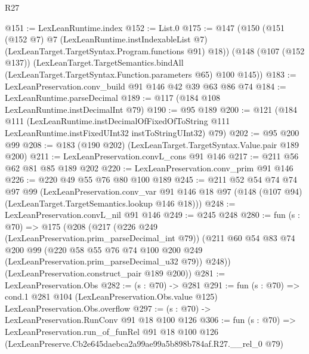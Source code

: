 \begin{lexlean}{R27}
\begin{coremodule}
@151 := LexLeanRuntime.index
@152 := List.{0}
@175 := @147
    (@150
      (@151
        (@152 @7)
        @7
        (LexLeanRuntime.instIndexableList @7)
        (LexLeanTarget.TargetSyntax.Program.functions @91)
        @18))
    (@148
      (@107 (@152 @137))
      (LexLeanTarget.TargetSemantics.bindAll
        (LexLeanTarget.TargetSyntax.Function.parameters @65)
        @100
        @145))
@183 := LexLeanPreservation.conv_build @91 @146 @42 @39 @63 @86 @74
@184 := LexLeanRuntime.parseDecimal
@189 := @117 (@184 @108 LexLeanRuntime.instDecimalInt @79)
@190 := @95 @189
@200 := @121
    (@184
      @111
      (LexLeanRuntime.instDecimalOfFixedOfToString
        @111
        LexLeanRuntime.instFixedUInt32
        instToStringUInt32)
      @79)
@202 := @95 @200 @99
@208 := @183 (@190 @202) (LexLeanTarget.TargetSyntax.Value.pair @189 @200)
@211 := LexLeanPreservation.convL_cons @91 @146
@217 := @211 @56 @62 @81 @85 @189 @202
@220 := LexLeanPreservation.conv_prim @91 @146
@226 := @220 @49 @55 @76 @80 @100 @189
@245 := @211
    @52
    @54
    @74
    @74
    @97
    @99
    (LexLeanPreservation.conv_var
      @91
      @146
      @18
      @97
      (@148 (@107 @94) (LexLeanTarget.TargetSemantics.lookup @146 @18)))
@248 := LexLeanPreservation.convL_nil @91 @146
@249 := @245 @248
@280 := fun (s : @70) =>
  @175
    (@208
      (@217
        (@226 @249 (LexLeanPreservation.prim_parseDecimal_int @79))
        (@211
          @60
          @54
          @83
          @74
          @200
          @99
          (@220 @58 @55 @76 @74 @100 @200 @249 (LexLeanPreservation.prim_parseDecimal_u32 @79))
          @248))
      (LexLeanPreservation.construct_pair @189 @200))
@281 := LexLeanPreservation.Obs
@282 := (s : @70) -> @281
@291 := fun (s : @70) =>
  cond.{1} @281 @104 (LexLeanPreservation.Obs.value @125) LexLeanPreservation.Obs.overflow
@297 := (s : @70) -> LexLeanPreservation.RunConv @91 @18 @100 @126
@306 := fun (s : @70) =>
  LexLeanPreservation.run_of_funRel
    @91
    @18
    @100
    @126
    (LexLeanPreserve.Cb2e645daebca2a99ae99a5b898b784af.R27.__rel_0 @79)
\end{coremodule}
\end{lexlean}
